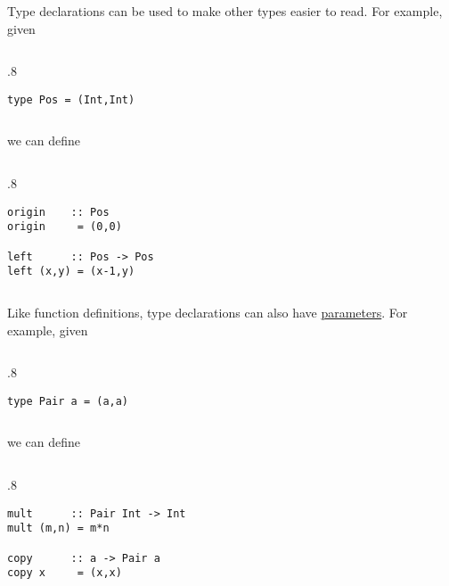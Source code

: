 \documentclass{beamer}
\newenvironment{codeblock}[1][.8]{%
\begin{columns}
\begin{column}{#1\linewidth}
\begin{exampleblock}{}}{%
\end{exampleblock}
\end{column}
\end{columns}}
\def\slideskip{\vskip 0.1in}
\begin{document}
\begin{frame}[fragile]
\Large


Type declarations can be used to make other types 
easier to read.  
For example, given 

\slideskip

\begin{codeblock}
\vspace{-2ex}
\begin{verbatim}
type Pos = (Int,Int)
\end{verbatim}
\vspace{-2ex}
\end{codeblock}

\slideskip
we can define
\slideskip
\begin{codeblock}
\vspace{-2ex}
\begin{verbatim}
origin    :: Pos 
origin     = (0,0) 

left      :: Pos -> Pos 
left (x,y) = (x-1,y) 
\end{verbatim}
\vspace{-2ex}
\end{codeblock}

\end{frame}

\begin{frame}[fragile]
\Large

Like function definitions, type declarations can also 
have \underline{parameters}. 
For example, given 

\slideskip

\begin{codeblock}
\vspace{-2ex}
\begin{verbatim}
type Pair a = (a,a) 
\end{verbatim}
\vspace{-2ex}
\end{codeblock}

\slideskip
we can define
\slideskip

\begin{codeblock}
\vspace{-2ex}
\begin{verbatim}
mult      :: Pair Int -> Int 
mult (m,n) = m*n

copy      :: a -> Pair a 
copy x     = (x,x)
\end{verbatim}
\vspace{-2ex}
\end{codeblock}

\end{frame}
\end{document}
